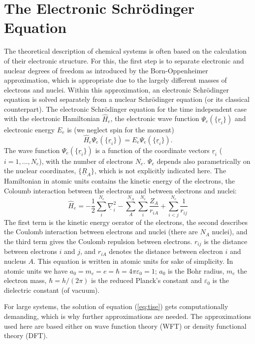 \documentclass[11pt,DIV=13,BCOR=5mm,a4paper,headinclude]{scrbook}
\renewcommand{\vec}[1]{\underline{#1}}
\begin{document}
\section{The Electronic Schr\"{o}dinger Equation}
The theoretical description of chemical systems is often based on the calculation of their electronic structure.
For this, the first step is to separate electronic and nuclear degrees of freedom as introduced by the Born-Oppenheimer approximation\cite{bornoppenheimer}, which is appropriate due to the largely different masses of electrons and nuclei.
Within this approximation, an electronic Schrödinger equation is solved separately from a nuclear Schrödinger equation (or its classical counterpart).
The electronic Schrödinger equation for the time independent case  with the electronic Hamiltonian $\hat{H}_e$, the electronic wave function $\Psi_e(\{\vec{r}_i\})$ and electronic energy $E_e$ is (we neglect spin for the moment)
\begin{equation}\label{eq:tise}
 \hat{H}_e\Psi_e(\{\vec{r}_i\})=E_e\Psi_e(\{\vec{r}_i\}).
\end{equation}
The wave function $\Psi_e(\{\vec{r}_i\})$ is a function of the coordinate vectors $\vec{r}_i$ ($i=1,...,N_e$), with the number of electrons $N_e$.
$\Psi_e$ depends also parametrically on the nuclear coordinates, $\{\vec{R}_A\}$, which is not explicitly indicated here.
The Hamiltonian in atomic units contains the kinetic energy of the electrons, the Coloumb interaction between the electrons and between electrons and nuclei:
\begin{equation}
 \hat{H}_e= -\frac{1}{2}\sum_i^{N_e}\vec{\nabla}_i^2 - \sum_A^{N_A}\sum_i^{N_e}\frac{Z_A}{r_{iA}} + \sum_{i<j}^{N_e}\frac{1}{r_{ij}}
\end{equation}
The first term is the kinetic energy oerator of the electrons, the second describes the Coulomb interaction between electrons and nuclei (there are $N_A$ nuclei), and the third term gives the Coulomb repulsion between electrons.
$r_{ij}$ is the distance between electrons $i$ and $j$, and $r_{iA}$ denotes the distance between electron $i$ and nucleus $A$.
This equation is written in atomic units for sake of simplicity.
In atomic units we have $a_0=m_e=e=\hbar=4\pi\varepsilon_0=1$; $a_0$ is the Bohr radius, $m_e$ the electron mass, $\hbar=h/(2\pi)$ is the reduced Planck's constant and $\varepsilon_0$ is the dielectric constant (of vacuum).

For large systems, %
the solution of equation (\ref{eq:tise}) gets computationally demanding, which is why further approximations are needed.
The approximations used here are based either on wave function theory (WFT) or density functional theory (DFT).
\end{document}
